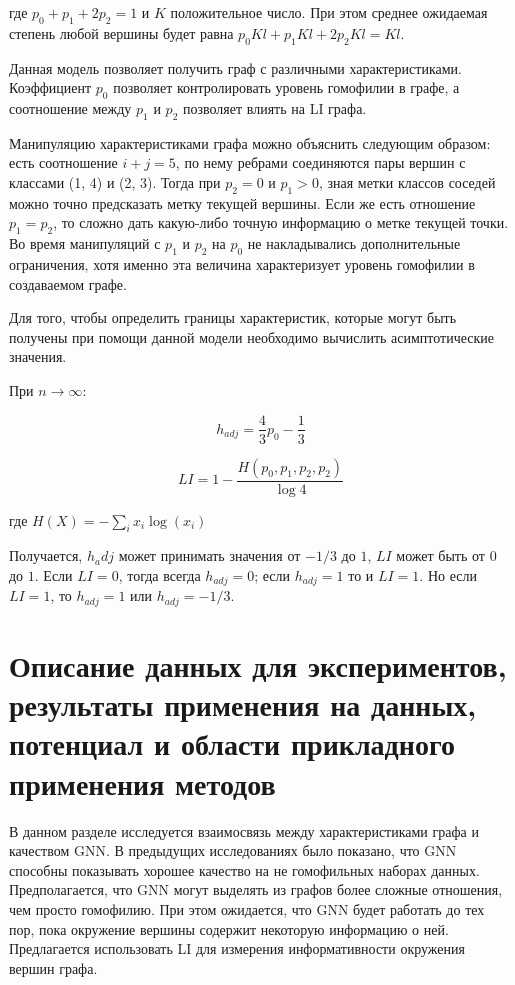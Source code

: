 \documentclass[a4paper,14pt]{article}
\begin{document}
	где $p_0+p_1+2p_2=1$ и $K$ положительное число.
	При этом среднее ожидаемая степень любой вершины будет равна $p_0 Kl+p_1 Kl+2p_2 Kl=Kl$.
	
	Данная модель позволяет получить граф с различными характеристиками.
	Коэффициент $p_0$ позволяет контролировать уровень гомофилии в графе, а соотношение между $p_1$ и $p_2$ позволяет влиять на LI графа.
	
	Манипуляцию характеристиками графа можно объяснить следующим образом: есть соотношение $i+j=5$, по нему ребрами соединяются пары вершин с классами (1, 4) и (2, 3).
	Тогда при $p_2=0$ и $p_1>0$, зная метки классов соседей можно точно предсказать метку текущей вершины.
	Если же есть отношение $p_1=p_2$, то сложно дать какую-либо точную информацию о метке текущей точки.
	Во время манипуляций с $p_1$ и $p_2$  на $p_0$ не накладывались дополнительные ограничения, хотя именно эта величина характеризует уровень гомофилии в создаваемом графе.
	
	Для того, чтобы определить границы характеристик, которые могут быть получены при помощи данной модели необходимо вычислить асимптотические значения.
	
	При $n \rightarrow \infty$:
	
	$$h_{adj} = \dfrac{4}{3}p_0 - \dfrac{1}{3}$$
	
	$$LI = 1 - \dfrac{H(p_0,p_1,p_2,p_2)}{\log 4}$$
	
	где $H(X) = -\sum_ix_i\log(x_i)$
	
	Получается, $h_adj$ может принимать значения от $-1/3$ до $1$, $LI$ может быть от $0$ до $1$. Если $LI=0$, тогда всегда $h_{adj}=0$; если $h_{adj}=1$ то и $LI=1$.
	Но если $LI=1$, то $h_{adj}=1$ или $h_{adj}=-1/3$.
	
	\pagebreak
	\section{Описание данных для экспериментов, результаты применения на данных, потенциал и области прикладного применения методов}
	\setcounter{figure}{0}
	
	В данном разделе исследуется взаимосвязь между характеристиками графа и качеством GNN.
	В предыдущих исследованиях было показано, что GNN способны показывать хорошее качество на не гомофильных наборах данных.
	Предполагается, что GNN могут выделять из графов более сложные отношения, чем просто гомофилию.
	При этом ожидается, что GNN будет работать до тех пор, пока окружение вершины содержит некоторую информацию о ней.
	Предлагается использовать LI для измерения информативности окружения вершин графа.
	
\end{document}
